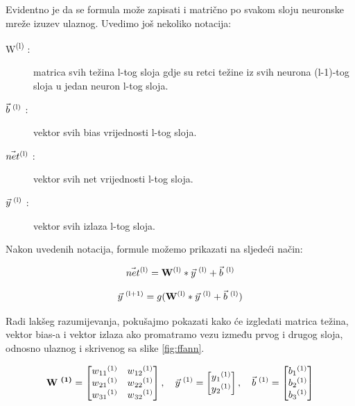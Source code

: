 \documentclass[times, utf8, zavrsni]{fer}
\begin{document}
Evidentno je da se formula može zapisati i matrično po svakom sloju neuronske mreže izuzev ulaznog. Uvedimo još nekoliko notacija:

\begin{description}
\item[W\textsuperscript{(l)} :] matrica svih težina l-tog sloja gdje su retci težine iz svih neurona (l-1)-tog sloja u jedan neuron l-tog sloja.
\item[$\Vec{b}\textsuperscript{ (l)}$ :] vektor svih bias vrijednosti l-tog sloja.
\item[$\Vec{net}\textsuperscript{(l)}$ :] vektor svih net vrijednosti l-tog sloja.
\item[$\Vec{y}\textsuperscript{ (l)}$ :] vektor svih izlaza l-tog sloja.
\end{description}

Nakon uvedenih notacija, formule možemo prikazati na sljedeći način:

\begin{equation}
    \label{eq:net-matrice}
    \text{$\Vec{net}\textsuperscript{(l)} = \textbf{W}\textsuperscript{(l)} * \Vec{y}\textsuperscript{ (l)} + \Vec{b}\textsuperscript{ (l)}$}
\end{equation}

\begin{equation}
    \label{eq:izlaz-matrice}
    \text{$\Vec{y}\textsuperscript{ (l+1)} = g(\textbf{W}\textsuperscript{(l)} * \Vec{y}\textsuperscript{ (l)} + \Vec{b}\textsuperscript{ (l)})$}
\end{equation}

Radi lakšeg razumijevanja, pokušajmo pokazati kako će izgledati matrica težina, vektor bias-a i vektor izlaza ako promatramo vezu između prvog i drugog sloja, odnosno ulaznog i skrivenog sa slike \ref{fig:ffann}.

\[
  \textbf{W\textsuperscript{ (1)}} =
  \begin{bmatrix}
    w\textsubscript{11}\textsuperscript{(1)} & w\textsubscript{12}\textsuperscript{(1)}\\
    w\textsubscript{21}\textsuperscript{(1)} & w\textsubscript{22}\textsuperscript{(1)}\\
    w\textsubscript{31}\textsuperscript{(1)} & w\textsubscript{32}\textsuperscript{(1)}
  \end{bmatrix},\quad
  \vec{y}\textsuperscript{ (1)} = 
  \begin{bmatrix}
   y\textsubscript{1}\textsuperscript{(1)} \\
   y\textsubscript{2}\textsuperscript{(1)}
  \end{bmatrix},\quad
  \vec{b}\textsuperscript{ (1)} = 
  \begin{bmatrix}
    b\textsubscript{1}\textsuperscript{(1)} \\
    b\textsubscript{2}\textsuperscript{(1)} \\
    b\textsubscript{3}\textsuperscript{(1)}
  \end{bmatrix}
\]
\end{document}
